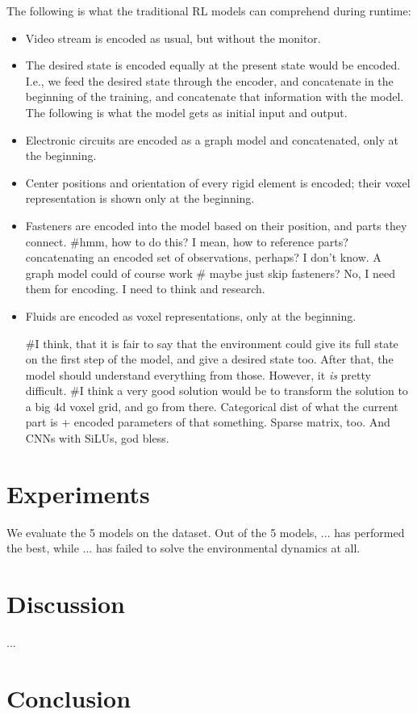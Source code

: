 \documentclass{article} %
\begin{document}
The following is what the traditional RL models can comprehend during runtime:
\begin{itemize}
    \item Video stream is encoded as usual, but without the monitor.
    \item The desired state is encoded equally at the present state would be encoded. I.e., we feed the desired state through the encoder, and concatenate in the beginning of the training, and concatenate that information with the model.
The following is what the model gets as initial input and output.
    \item Electronic circuits are encoded as a graph model and concatenated, only at the beginning.
    \item Center positions and orientation of every rigid element is encoded; their voxel representation is shown only at the beginning.
    \item Fasteners are encoded into the model based on their position, and parts they connect. #hmm, how to do this? I mean, how to reference parts? concatenating an encoded set of observations, perhaps? I don't know. A graph model could of course work # maybe just skip fasteners? No, I need them for encoding. I need to think and research.
    \item Fluids are encoded as voxel representations, only at the beginning.

#I think, that it is fair to say that the environment could give its full state on the first step of the model, and give a desired state too. After that, the model should understand everything from those. However, it \textit{is} pretty  difficult.
#I think a very good solution would be to transform the solution to a big 4d voxel grid, and go from there. Categorical dist of what the current part is + encoded parameters of that something. Sparse matrix, too. And CNNs with SiLUs, god bless.
\end{itemize}

\section{Experiments}
We evaluate the 5 models on the dataset. Out of the 5 models, ... has performed the best, while ... has failed to solve the environmental dynamics at all.


\section{Discussion}
...
\section{Conclusion}
\end{document}
